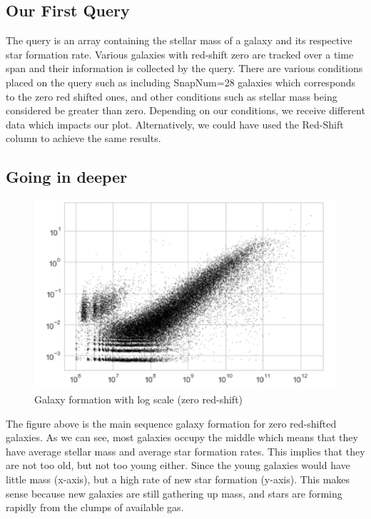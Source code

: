 \documentclass[12pt]{article}
\begin{document}
\subsection{Our First Query}

The query is an array containing the stellar mass of a galaxy and its respective star formation rate. Various galaxies with red-shift zero are tracked over a time span and their information is collected by the query. There are various conditions placed on the query such as including SnapNum=28 galaxies which corresponds to the zero red shifted ones, and other conditions such as stellar mass being considered be greater than zero. Depending on our conditions, we receive different data which impacts our plot. Alternatively, we could have used the Red-Shift column to achieve the same results.

\subsection{Going in deeper}

\begin{figure}
  \centerline{\includegraphics{d.png}}
  \caption{Galaxy formation with log scale (zero red-shift)}
  \label{fig:picture}
\end{figure}

The figure above is the main sequence galaxy formation for zero red-shifted galaxies. As we can see, most galaxies occupy the middle which means that they have average stellar mass and average star formation rates. This implies that they are not too old, but not too young either. Since the young galaxies would have little mass (x-axis), but a high rate of new star formation (y-axis). This makes sense because new galaxies are still gathering up mass, and stars are forming rapidly from the clumps of available gas. 
\end{document}
